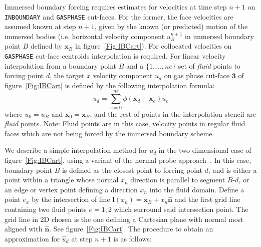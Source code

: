 \documentclass[12pt]{article}
\begin{document}
Immersed boundary forcing requires estimates for velocities at time step $n+1$ on \texttt{INBOUNDARY} and \texttt{GASPHASE} cut-faces. For the former, the face velocities are assumed known at step $n+1$, given by the known (or predicted) motion of the immersed bodies (i.e. horizontal velocity component $u_{B}^{n+1}$ in immersed boundary point $B$ defined by $\mathbf{x}_B$ in figure~\ref{Fig:IBCart}). For collocated velocities on  \texttt{GASPHASE} cut-face centroids interpolation is required. For linear velocity interpolation from a boundary point $B$ and a $\{1,...,ne\}$ set of \textit{fluid} points to forcing point $d$, the target $x$ velocity component $u_d$ on gas phase cut-face $\mathbf{3}$ of figure~\ref{Fig:IBCart} is defined by the following interpolation formula:
%
\begin{equation}
   u_d = \sum_{e=0}^{ne} \phi (\mathbf{x}_d - \mathbf{x}_e) u_e \label{eq:interpu}
\end{equation}
%
where $u_0=u_B$ and $\mathbf{x}_0=\mathbf{x}_B$, and the rest of points in the interpolation stencil are \textit{fluid} points.
Note: Fluid points are in this case, velocity points in regular fluid faces which are not being forced by the immersed boundary scheme.

We describe a simple interpolation method for $u_d$ in the two dimensional case of figure~\ref{Fig:IBCart}, using a variant of the normal probe approach~\cite{Balaras:2004}. In this case, boundary point $B$ is defined as the closest point to forcing point $d$, and is either a point within a triangle whose normal $x_n$ direction is parallel to segment $\overline{B\mbox{-} d}$, or an edge or vertex point defining a direction $x_n$ into the fluid domain.
Define a point $\overline{e_x}$ by the intersection of line $\mathbf{l}(x_n)=\mathbf{x}_B+ x_n \mathbf{\hat{n}}$ and the first grid line containing two fluid points $e=1,2$ which surround said intersection point. The grid line in 2D chosen is the one defining a Cartesian plane with normal most aligned with $\mathbf{\hat{n}}$. See figure~\ref{Fig:IBCart}.
The procedure to obtain an approximation for $\hat{u}_d$ at step $n+1$ is as follows:
\end{document}
